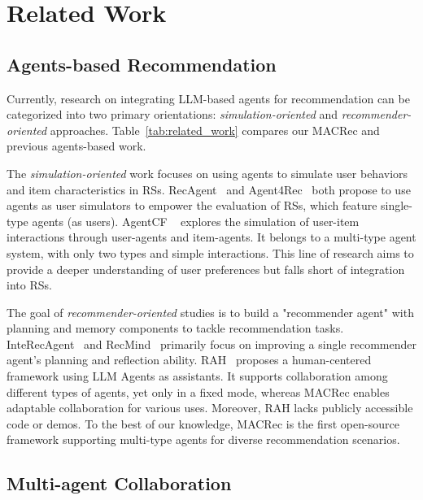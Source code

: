 \section{Related Work}
\subsection{Agents-based Recommendation}

Currently, research on integrating LLM-based agents for recommendation can be categorized into two primary orientations: \textsl{simulation-oriented} and \textsl{recommender-oriented} approaches. Table~\ref{tab:related_work} compares our MACRec and previous agents-based work.

The \textsl{simulation-oriented} work focuses on using agents to simulate user behaviors and item characteristics in RSs. RecAgent~\cite{zhang2023generative} and Agent4Rec~\cite{wang2023RecAgent} both propose to use agents as user simulators to empower the evaluation of RSs, which feature single-type agents (as users).
AgentCF ~\cite{zhang2023agentcf} explores the simulation of user-item interactions through user-agents and item-agents. It belongs to a multi-type agent system, with only two types and simple interactions.
This line of research aims to provide a deeper understanding of user preferences but falls short of integration into RSs.

The goal of \textsl{recommender-oriented} studies is to build a "recommender agent" with planning and memory components to tackle recommendation tasks. 
InteRecAgent~\cite{huang2023InteRecAgent} and RecMind~\cite{wang2023recmind} primarily focus on improving a single recommender agent's planning and reflection ability.
RAH~\cite{shu2023rah} proposes a human-centered framework using LLM Agents as assistants.
It supports collaboration among different types of agents, yet only in a fixed mode, whereas MACRec enables adaptable collaboration for various uses. Moreover, RAH lacks publicly accessible code or demos.
To the best of our knowledge, MACRec is the first open-source framework supporting multi-type agents for diverse recommendation scenarios.



\subsection{Multi-agent Collaboration}

